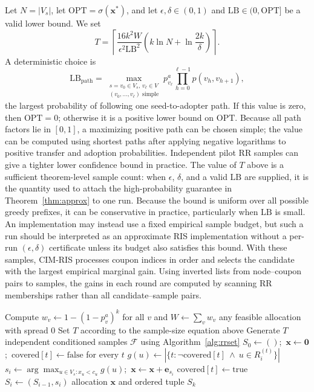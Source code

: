 \documentclass[sigconf,balance=false]{acmart}
\newcommand{\CIMRIS}{\textsc{CIM-RIS}}
\begin{document}
Let $N=|V_s|$, let $\mathrm{OPT}=\sigma(\bm{x}^*)$, and let
$\epsilon,\delta\in(0,1)$ and
$\mathrm{LB}\in(0,\mathrm{OPT}]$ be a valid lower bound.
We set
\[
  T=\left\lceil
    \frac{16k^2W}{\epsilon^2\mathrm{LB}^2}
    \left(k\ln N+\ln\frac{2k}{\delta}\right)
  \right\rceil.
\]
A deterministic choice is
\[
  \mathrm{LB}_{\mathrm{path}}
  =\max_{\substack{s=v_0\in V_s,\,v_\ell\in V\\
                   (v_0,\ldots,v_\ell)\text{ simple}}}
    p_{v_\ell}^a\prod_{h=0}^{\ell-1}p(v_h,v_{h+1}),
\]
the largest probability of following one seed-to-adopter path.
If this value is zero, then $\mathrm{OPT}=0$; otherwise it is a positive
lower bound on $\mathrm{OPT}$.
Because all path factors lie in $[0,1]$, a maximizing positive path can be
chosen simple; the value can be computed using shortest paths after applying
negative logarithms to positive transfer and adoption probabilities.
Independent pilot RR samples can give a tighter lower confidence bound in
practice.
The value of $T$ above is a sufficient theorem-level sample count: when
$\epsilon$, $\delta$, and a valid $\mathrm{LB}$ are supplied, it is the
quantity used to attach the high-probability guarantee in
Theorem~\ref{thm:approx} to one run.
Because the bound is uniform over all possible greedy prefixes, it can be
conservative in practice, particularly when $\mathrm{LB}$ is small.
An implementation may instead use a fixed empirical sample budget, but such a
run should be interpreted as an approximate RIS implementation without a
per-run $(\epsilon,\delta)$ certificate unless its budget also satisfies this
bound.
With these samples, \CIMRIS{} processes coupon indices in order and
selects the candidate with the largest empirical marginal gain.
Using inverted lists from node--coupon pairs to samples, the gains in
each round are computed by scanning RR memberships rather than all
candidate--sample pairs.

\begin{algorithm}[t]
\caption{\CIMRIS{}$(G,V_s,\bm{c},k,\epsilon,\delta,\mathrm{LB})$}
\label{alg:cim-ris}
\begin{algorithmic}[1]
\State Compute $w_v\gets1-(1-p_v^a)^k$ for all $v$ and
  $W\gets\sum_v w_v$
  \State \Return any feasible allocation with spread $0$
\EndIf
\State Set $T$ according to the sample-size equation above
\State Generate $T$ independent conditioned samples $\mathcal{F}$
  using Algorithm~\ref{alg:rrset}
\State $S_0\gets()$;\ $\bm{x}\gets\bm{0}$;\
  $\mathrm{covered}[t]\gets\mathrm{false}$ for every $t$
    \State $g(u)\gets
      |\{t:\neg\mathrm{covered}[t]\ \wedge\ u\in R_i^{(t)}\}|$
  \EndFor
  \State $s_i\gets\arg\max_{u\in V_s:x_u<c_u}g(u)$;\
    $\bm{x}\gets\bm{x}+\bm{e}_{s_i}$
    \State $\mathrm{covered}[t]\gets\mathrm{true}$
  \EndFor
  \State $S_i\gets(S_{i-1},s_i)$
\EndFor
\State \Return allocation $\bm{x}$ and ordered tuple $S_k$
\end{algorithmic}
\end{algorithm}
\end{document}
